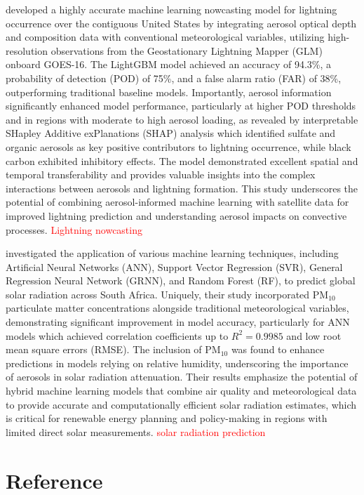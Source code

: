 \documentclass[11pt]{article}
\begin{document}
\citet{song2023lightning} developed a highly accurate machine learning nowcasting model for lightning occurrence over the contiguous United States by integrating aerosol optical depth and composition data with conventional meteorological variables, utilizing high-resolution observations from the Geostationary Lightning Mapper (GLM) onboard GOES-16. The LightGBM model achieved an accuracy of 94.3\%, a probability of detection (POD) of 75\%, and a false alarm ratio (FAR) of 38\%, outperforming traditional baseline models. Importantly, aerosol information significantly enhanced model performance, particularly at higher POD thresholds and in regions with moderate to high aerosol loading, as revealed by interpretable SHapley Additive exPlanations (SHAP) analysis which identified sulfate and organic aerosols as key positive contributors to lightning occurrence, while black carbon exhibited inhibitory effects. The model demonstrated excellent spatial and temporal transferability and provides valuable insights into the complex interactions between aerosols and lightning formation. This study underscores the potential of combining aerosol-informed machine learning with satellite data for improved lightning prediction and understanding aerosol impacts on convective processes. \textcolor{red}{Lightning nowcasting}

\citet{govindasamy2021machine} investigated the application of various machine learning techniques, including Artificial Neural Networks (ANN), Support Vector Regression (SVR), General Regression Neural Network (GRNN), and Random Forest (RF), to predict global solar radiation across South Africa. Uniquely, their study incorporated PM$_{10}$ particulate matter concentrations alongside traditional meteorological variables, demonstrating significant improvement in model accuracy, particularly for ANN models which achieved correlation coefficients up to \( R^{2} = 0.9985 \) and low root mean square errors (RMSE). The inclusion of PM$_{10}$ was found to enhance predictions in models relying on relative humidity, underscoring the importance of aerosols in solar radiation attenuation. Their results emphasize the potential of hybrid machine learning models that combine air quality and meteorological data to provide accurate and computationally efficient solar radiation estimates, which is critical for renewable energy planning and policy-making in regions with limited direct solar measurements. \textcolor{red}{solar radiation prediction}

\section{Reference}


\end{document}
